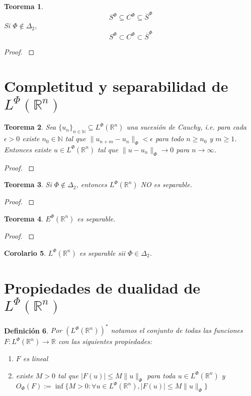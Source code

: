 \documentclass[a4paper,11pt]{amsart}
\theoremstyle{plain}
\newtheorem{thm}{Teorema}[section]
\newtheorem{cor}[thm]{Corolario }
\newtheorem{defi}[thm]{Definici\'on}
\theoremstyle{remark}
\theoremstyle{remark}
\newcommand{\rr}{\mathbb{R}}
\newcommand{\nn}{\mathbb{N}}
\numberwithin{equation}{section}
\begin{document}
\begin{thm}
\[
S^{\Phi}\subseteq C^{\Phi} \subseteq \overline{S}^{\Phi}
\]
Si $\Phi\notin \Delta_2$, 
\[
S^{\Phi}\subset C^{\Phi} \subset \overline{S}^{\Phi}
\]
\end{thm}

\begin{proof}
\cite[pp. 374-375]{Schap2005}
\end{proof}


\section{Completitud y separabilidad de $L^{\Phi}(\rr^n)$}

\begin{thm}
Sea $\{u_n\}_{n \in \nn}\subseteq L^{\Phi}(\rr^n)$ una sucesi\'on de Cauchy, i.e.
 para cada $\epsilon>0$ existe $n_0 \in \nn$ tal que $\|u_{n+m}-u_n\|_{\Phi}<\epsilon$
para todo $n \geq n_0$ y $m\geq 1$.
Entonces existe $u \in L^{\Phi}(\rr^n)$ tal que $\|u-u_n\|_{\Phi}\to 0$ para $n \to \infty$.
\end{thm}

\begin{proof}
\cite[pp. 375-376]{Schap2005}
\end{proof}

\begin{thm}
Si $\Phi \notin \Delta_2$, entonces $L^{\Phi}(\rr^n)$ NO es separable.
\end{thm}

\begin{proof}
\cite[p. 376]{Schap2005}
\end{proof}

\begin{thm}
$E^{\Phi}(\rr^n)$ es separable.
\end{thm}

\begin{proof}
\cite[p. 376]{Schap2005}
\end{proof}

\begin{cor}
$L^{\Phi}(\rr^n)$ es separable sii $\Phi \in \Delta_2$.
\end{cor}

\section{Propiedades de dualidad de $L^{\Phi}(\rr^n)$}

\begin{defi}
Por $(L^{\Phi}(\rr^n))^*$ notamos el conjunto de todas las funciones $F:L^{\Phi}(\rr^n)\to \rr$ con las siguientes propiedades:
\begin{enumerate}
\item $F$ es lineal
\item existe $M>0$ tal que $|F(u)|\leq M \|u\|_{\Phi}$ para toda $u \in L^{\Phi}(\rr^n)$ y 
$O_{\Phi}(F):=\inf\{M>0: \forall u\in L^{\Phi}(\rr^n), |F(u)|\leq M\|u\|_{\Phi}\}$
\end{enumerate}
\end{defi}
\end{document}
